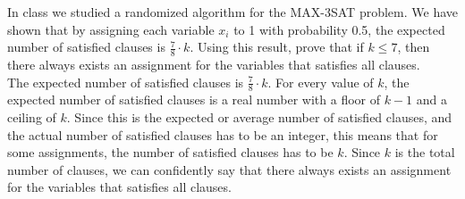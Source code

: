\documentclass[paper=a4, fontsize=11pt]{scrartcl} %
\numberwithin{figure}{section} %
\numberwithin{table}{section} %
\begin{document}
\begin{enumerate}
In class we studied a randomized algorithm for the MAX-3SAT problem. We have shown
that by assigning each variable $x_i$ to 1 with probability 0.5, the expected number of satisfied clauses is $\frac{7}{8} \cdot k$. Using this result, prove that if $k \leq 7$, then there always exists an assignment for the variables that satisfies all clauses.\\

The expected number of satisfied clauses is $\frac{7}{8} \cdot k$. For every value of $k$,  the expected number of satisfied clauses is a real number with a floor of $k-1$ and a ceiling of $k$. Since this is the expected or average number of satisfied clauses, and the actual number of satisfied clauses has to be an integer, this means that for some assignments, the number of satisfied clauses has to be $k$. Since $k$ is the total number of clauses, we can confidently say that there always exists an assignment for the variables that satisfies all clauses.
\end{enumerate}

\end{document}

